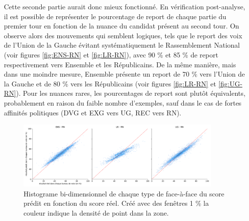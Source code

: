 \documentclass[11pt]{article}
\begin{document}
            Cette seconde partie aurait donc mieux fonctionné. En vérification post-analyse, il est possible de représenter le pourcentage de report de chaque partie du premier tour en fonction de la nuance du candidat présent au second tour. On observe alors des mouvements qui semblent logiques, tels que le report des voix de l'Union de la Gauche évitant systématiquement le Rassemblement National (voir figures \ref{fig:ENS-RN} et \ref{fig:LR-RN}), avec 90 \% et 85 \% de report respectivement vers Ensemble et les Républicains. De la même manière, mais dans une moindre mesure, Ensemble présente un report de 70 \% vers l'Union de la Gauche et de 80 \% vers les Républicains (voir figures \ref{fig:LR-RN} et \ref{fig:UG-RN}). Pour les nuances rares, les pourcentages de report sont plutôt équivalents, probablement en raison du faible nombre d'exemples, sauf dans le cas de fortes affinités politiques (DVG et EXG vers UG, REC vers RN).

            \begin{figure}
                \begin{center}
                    \includegraphics[width=0.9\textwidth]{Focus_True_Pred_Hist.pdf}
                    \caption{Histograme bi-dimensionnel de chaque type de face-à-face du score prédit en fonction du score réel. Créé avec des fenêtres 1 \% la couleur indique la densité de point dans la zone.}
                    \label{fig:Focus_pred_true}
                \end{center}
            \end{figure}
            
\end{document}
